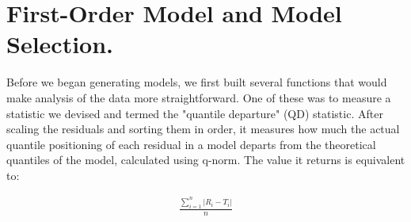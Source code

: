 \documentclass{article}\usepackage[]{graphicx}\usepackage[]{xcolor}
\begin{document}
\section{First-Order Model and Model Selection.}

Before we began generating models, we first built several functions that would make analysis of the data more straightforward. One of these was to measure a statistic we devised and termed the "quantile departure" (QD) statistic. After scaling the residuals and sorting them in order, it measures how much the actual quantile positioning of each residual in a model departs from the theoretical quantiles of the model, calculated using q-norm. The value it returns is equivalent to: 

\begin{align*}
\frac{\sum_{i=1}^{n}|R_i - T_i|}{n}
\end{align*}
\end{document}
